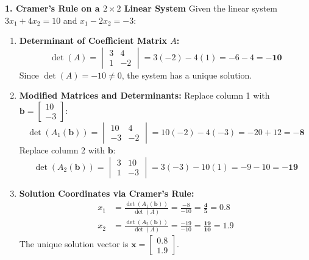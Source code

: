 \textbf{1. Cramer's Rule on a $2 \times 2$ Linear System}
Given the linear system $3x_1 + 4x_2 = 10$ and $x_1 - 2x_2 = -3$:
\begin{enumerate}
    \item \textbf{Determinant of Coefficient Matrix $A$:}
    \begin{equation*}
    \det(A) = \begin{vmatrix} 3 & 4 \\ 1 & -2 \end{vmatrix} = 3(-2) - 4(1) = -6 - 4 = \mathbf{-10}
    \end{equation*}
    Since $\det(A) = -10 \neq 0$, the system has a unique solution.
    \item \textbf{Modified Matrices and Determinants:}
    Replace column 1 with $\mathbf{b} = \begin{bmatrix} 10 \\ -3 \end{bmatrix}$:
    \begin{equation*}
    \det(A_1(\mathbf{b})) = \begin{vmatrix} 10 & 4 \\ -3 & -2 \end{vmatrix} = 10(-2) - 4(-3) = -20 + 12 = \mathbf{-8}
    \end{equation*}
    Replace column 2 with $\mathbf{b}$:
    \begin{equation*}
    \det(A_2(\mathbf{b})) = \begin{vmatrix} 3 & 10 \\ 1 & -3 \end{vmatrix} = 3(-3) - 10(1) = -9 - 10 = \mathbf{-19}
    \end{equation*}
    \item \textbf{Solution Coordinates via Cramer's Rule:}
    \begin{align*}
    x_1 &= \frac{\det(A_1(\mathbf{b}))}{\det(A)} = \frac{-8}{-10} = \mathbf{\frac{4}{5} = 0.8} \\
    x_2 &= \frac{\det(A_2(\mathbf{b}))}{\det(A)} = \frac{-19}{-10} = \mathbf{\frac{19}{10} = 1.9}
    \end{align*}
    The unique solution vector is $\mathbf{x} = \begin{bmatrix} 0.8 \\ 1.9 \end{bmatrix}$.
\end{enumerate}


